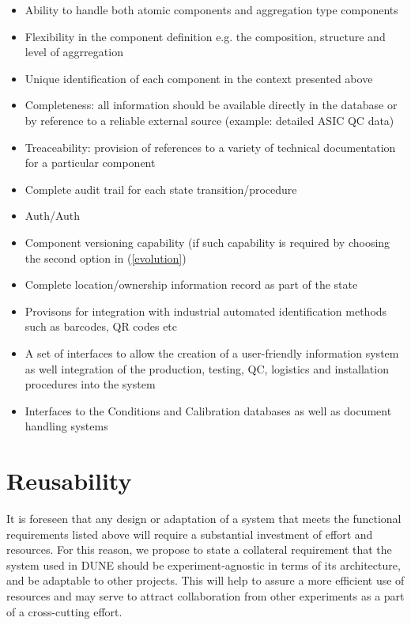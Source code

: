 \documentclass[pdftex,12pt,letter]{article}
\begin{document}
\begin{itemize}

\item Ability to handle both atomic components and aggregation type components

\item Flexibility in the component definition e.g. the composition, structure and level of aggrregation

\item Unique identification of each component in the context presented above

\item Completeness: all information should be available directly in the database or by reference to a reliable external source
(example: detailed ASIC QC data)

\item Treaceability: provision of references to a variety of technical documentation for a particular component

\item Complete audit trail for each state transition/procedure

\item Auth/Auth

\item Component versioning capability (if such capability is required by choosing the second option in (\ref{evolution})

\item Complete location/ownership information record as part of the state

\item Provisons for integration with industrial automated identification methods such as barcodes, QR codes etc

\item A set of interfaces to allow the creation of a user-friendly information system as well integration of the production, testing, QC,
logistics and installation procedures into the system

\item Interfaces to the Conditions and Calibration databases as well as document handling systems

\end{itemize}


\section{Reusability}

It is foreseen that any design or adaptation of a system that meets the functional requirements listed
above will require a substantial investment of effort and resources. For this reason, we propose to
state a collateral requirement that the system used in DUNE should be experiment-agnostic in
terms of its architecture, and be adaptable to other projects. This will help to assure a more
efficient use of resources and may serve to attract collaboration from other experiments
as a part of a cross-cutting effort.
\end{document}
